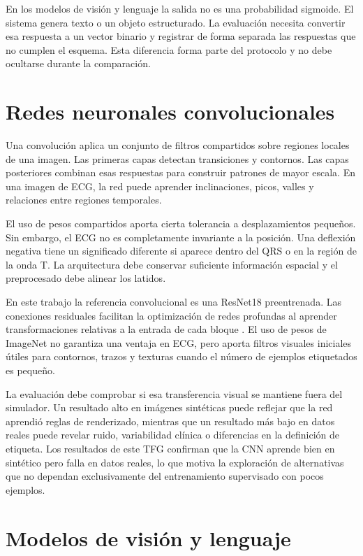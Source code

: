 En los modelos de visión y lenguaje la salida no es una probabilidad sigmoide. El sistema genera texto o un objeto estructurado. La evaluación necesita convertir esa respuesta a un vector binario y registrar de forma separada las respuestas que no cumplen el esquema. Esta diferencia forma parte del protocolo y no debe ocultarse durante la comparación.

\section{Redes neuronales convolucionales}

Una convolución aplica un conjunto de filtros compartidos sobre regiones locales de una imagen. Las primeras capas detectan transiciones y contornos. Las capas posteriores combinan esas respuestas para construir patrones de mayor escala. En una imagen de ECG, la red puede aprender inclinaciones, picos, valles y relaciones entre regiones temporales.

El uso de pesos compartidos aporta cierta tolerancia a desplazamientos pequeños. Sin embargo, el ECG no es completamente invariante a la posición. Una deflexión negativa tiene un significado diferente si aparece dentro del QRS o en la región de la onda T. La arquitectura debe conservar suficiente información espacial y el preprocesado debe alinear los latidos.

En este trabajo la referencia convolucional es una ResNet18 preentrenada. Las conexiones residuales facilitan la optimización de redes profundas al aprender transformaciones relativas a la entrada de cada bloque \cite{he2016}. El uso de pesos de ImageNet no garantiza una ventaja en ECG, pero aporta filtros visuales iniciales útiles para contornos, trazos y texturas cuando el número de ejemplos etiquetados es pequeño.

La evaluación debe comprobar si esa transferencia visual se mantiene fuera del simulador. Un resultado alto en imágenes sintéticas puede reflejar que la red aprendió reglas de renderizado, mientras que un resultado más bajo en datos reales puede revelar ruido, variabilidad clínica o diferencias en la definición de etiqueta. Los resultados de este TFG confirman que la CNN aprende bien en sintético pero falla en datos reales, lo que motiva la exploración de alternativas que no dependan exclusivamente del entrenamiento supervisado con pocos ejemplos.

\section{Modelos de visión y lenguaje}

